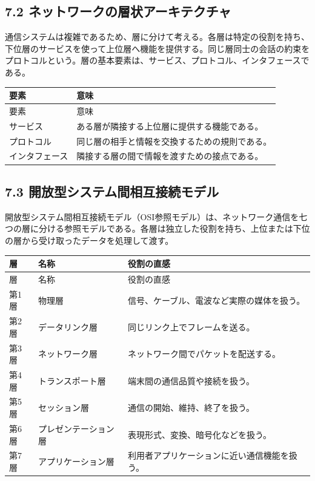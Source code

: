 \documentclass[a4paper,11pt]{ltjsarticle}
\begin{document}
\subsection{7.2 ネットワークの層状アーキテクチャ}

通信システムは複雑であるため、層に分けて考える。各層は特定の役割を持ち、下位層のサービスを使って上位層へ機能を提供する。同じ層同士の会話の約束をプロトコルという。層の基本要素は、サービス、プロトコル、インタフェースである。

\begin{longtable}{>{\raggedright\arraybackslash}p{}>{\raggedright\arraybackslash}p{}}
\toprule
要素 & 意味 \\
\midrule
\endfirsthead
\toprule
要素 & 意味 \\
\midrule
\endhead
サービス & ある層が隣接する上位層に提供する機能である。 \\
プロトコル & 同じ層の相手と情報を交換するための規則である。 \\
インタフェース & 隣接する層の間で情報を渡すための接点である。 \\
\bottomrule
\end{longtable}

\subsection{7.3 開放型システム間相互接続モデル}

開放型システム間相互接続モデル（OSI参照モデル）は、ネットワーク通信を七つの層に分ける参照モデルである。各層は独立した役割を持ち、上位または下位の層から受け取ったデータを処理して渡す。

\begin{longtable}{>{\raggedright\arraybackslash}p{}>{\raggedright\arraybackslash}p{}>{\raggedright\arraybackslash}p{}}
\toprule
層 & 名称 & 役割の直感 \\
\midrule
\endfirsthead
\toprule
層 & 名称 & 役割の直感 \\
\midrule
\endhead
第1層 & 物理層 & 信号、ケーブル、電波など実際の媒体を扱う。 \\
第2層 & データリンク層 & 同じリンク上でフレームを送る。 \\
第3層 & ネットワーク層 & ネットワーク間でパケットを配送する。 \\
第4層 & トランスポート層 & 端末間の通信品質や接続を扱う。 \\
第5層 & セッション層 & 通信の開始、維持、終了を扱う。 \\
第6層 & プレゼンテーション層 & 表現形式、変換、暗号化などを扱う。 \\
第7層 & アプリケーション層 & 利用者アプリケーションに近い通信機能を扱う。 \\
\bottomrule
\end{longtable}
\end{document}
